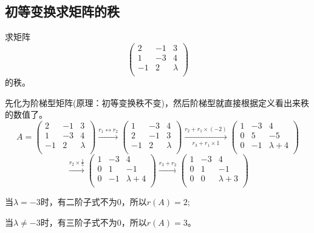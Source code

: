 \subsection{初等变换求矩阵的秩}
\begin{problem}
	求矩阵$$\left (
	\begin{matrix}
			2  & -1 & 3       \\
			1  & -3 & 4       \\
			-1 & 2  & \lambda \\
		\end{matrix}
	\right  )$$的秩。
\end{problem}
\begin{solution}
	先化为阶梯型矩阵(原理：初等变换秩不变)，然后阶梯型就直接根据定义看出来秩的数值了。
$$A=\left (
	\begin{matrix}
			2  & -1 & 3       \\
			1  & -3 & 4       \\
			-1 & 2  & \lambda \\
		\end{matrix}
	\right  )\xrightarrow{r_1\leftrightarrow r_2}\left (
	\begin{matrix}
			1  & -3 & 4       \\
			2  & -1 & 3       \\
			-1 & 2  & \lambda \\
		\end{matrix}
	\right  )\xrightarrow[r_3+r_1\times 1]{r_2+r_1\times(-2)} \left (
	\begin{matrix}
			1 & -3 & 4         \\
			0 & 5  & -5        \\
			0 & -1 & \lambda+4 \\
		\end{matrix}
	\right  )$$
$$\xrightarrow{r_2\times\frac{1}{5}}\left (
	\begin{matrix}
			1 & -3 & 4         \\
			0 & 1  & -1        \\
			0 & -1 & \lambda+4 \\
		\end{matrix}
	\right  )\xrightarrow{r_3+r_2}\left (
	\begin{matrix}
			1 & -3 & 4         \\
			0 & 1  & -1        \\
			0 & 0  & \lambda+3 \\
		\end{matrix}
	\right  )$$

当$\lambda=-3$时，有二阶子式不为0，所以$r(A)=2$;

当$\lambda\neq-3$时，有三阶子式不为0，所以$r(A)=3$。
\end{solution}

